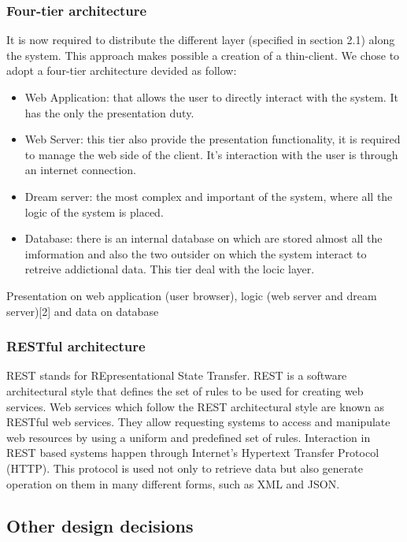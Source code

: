 \subsubsection{Four-tier architecture}
It is now required to distribute the different layer (specified in section 2.1) along the system. This approach makes possible a creation of a thin-client. We chose to adopt a four-tier architecture devided as follow:
\begin{itemize}
    \item Web Application: that allows the user to directly interact with the system. It has the only the presentation duty.
    \item Web Server: this tier also provide the presentation functionality, it is required to manage the web side of the client. It's interaction with the user is through an internet connection.
    \item Dream server: the most complex and important of the system, where all the logic of the system is placed.
    \item Database: there is an internal database on which are stored almost all the imformation and also the two outsider on which the system interact to retreive addictional data. This tier deal with the locic layer.
\end{itemize}
Presentation on web application (user browser), logic (web server and dream server)[2] and data on database 

\subsubsection{RESTful architecture}
REST stands for REpresentational State Transfer. REST is a software architectural style that defines the set of rules to be used for creating web services. Web services which follow the REST architectural style are known as RESTful web services. They allow requesting systems to access and manipulate web resources by using a uniform and predefined set of rules. Interaction in REST based systems happen through Internet’s Hypertext Transfer Protocol (HTTP). This protocol is used not only to retrieve data but also generate operation on them in many different forms, such as XML and JSON.

\subsection{Other design decisions}

